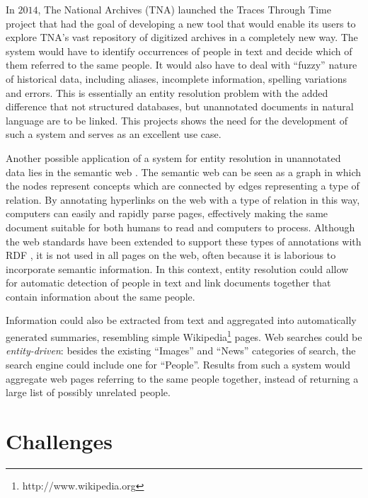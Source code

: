 In $2014$, The National Archives (TNA) launched the Traces Through Time project that had the goal of developing a new tool that would enable its users to explore TNA's vast repository of digitized archives in a completely new way.
The system would have to identify occurrences of people in text and decide which of them referred to the same people.
It would also have to deal with ``fuzzy'' nature of historical data, including aliases, incomplete information, spelling variations and errors.
This is essentially an entity resolution problem with the added difference that not structured databases, but unannotated documents in natural language are to be linked.
This projects shows the need for the development of such a system and serves as an excellent use case.

Another possible application of a system for entity resolution in unannotated data lies in the semantic web \citep{Berners2001, Mihalcea2007}.
The semantic web can be seen as a graph in which the nodes represent concepts which are connected by edges representing a type of relation.
By annotating hyperlinks on the web with a type of relation in this way, computers can easily and rapidly parse pages, effectively making the same document suitable for both humans to read and computers to process.
Although the web standards have been extended to support these types of annotations with RDF \citep{Pan2009}, it is not used in all pages on the web, often because it is laborious to incorporate semantic information.
In this context, entity resolution could allow for automatic detection of people in text and link documents together that contain information about the same people.

Information could also be extracted from text and aggregated into automatically generated summaries, resembling simple Wikipedia\footnote{http://www.wikipedia.org} pages.
Web searches could be \emph{entity-driven}: besides the existing ``Images'' and ``News'' categories of search, the search engine could include one for ``People''.
Results from such a system would aggregate web pages referring to the same people together, instead of returning a large list of possibly unrelated people.




\section{Challenges}
\label{sec:challenges}

